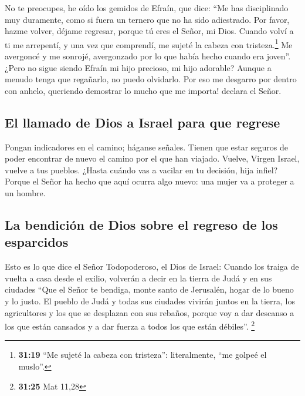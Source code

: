  No te preocupes, he oído los gemidos de Efraín, que
dice: ``Me has disciplinado muy duramente, como si fuera un ternero que
no ha sido adiestrado. Por favor, hazme volver, déjame regresar, porque
tú eres el Señor, mi Dios.  Cuando volví a ti me
arrepentí, y una vez que comprendí, me sujeté la cabeza con
tristeza.\footnote{\textbf{31:19} ``Me sujeté la cabeza con tristeza'':
  literalmente, ``me golpeé el muslo''.} Me avergoncé y me sonrojé,
avergonzado por lo que había hecho cuando era joven''. 
¿Pero no sigue siendo Efraín mi hijo precioso, mi hijo adorable? Aunque
a menudo tenga que regañarlo, no puedo olvidarlo. Por eso me desgarro
por dentro con anhelo, queriendo demostrar lo mucho que me importa!
declara el Señor.

\hypertarget{el-llamado-de-dios-a-israel-para-que-regrese}{%
\subsection{El llamado de Dios a Israel para que
regrese}\label{el-llamado-de-dios-a-israel-para-que-regrese}}

 Pongan indicadores en el camino; háganse señales. Tienen
que estar seguros de poder encontrar de nuevo el camino por el que han
viajado. Vuelve, Virgen Israel, vuelve a tus pueblos. 
¿Hasta cuándo vas a vacilar en tu decisión, hija infiel? Porque el Señor
ha hecho que aquí ocurra algo nuevo: una mujer va a proteger a un
hombre.

\hypertarget{la-bendiciuxf3n-de-dios-sobre-el-regreso-de-los-esparcidos}{%
\subsection{La bendición de Dios sobre el regreso de los
esparcidos}\label{la-bendiciuxf3n-de-dios-sobre-el-regreso-de-los-esparcidos}}

 Esto es lo que dice el Señor Todopoderoso, el Dios de
Israel: Cuando los traiga de vuelta a casa desde el exilio, volverán a
decir en la tierra de Judá y en sus ciudades ``Que el Señor te bendiga,
monte santo de Jerusalén, hogar de lo bueno y lo justo. 
El pueblo de Judá y todas sus ciudades vivirán juntos en la tierra, los
agricultores y los que se desplazan con sus rebaños, 
porque voy a dar descanso a los que están cansados y a dar fuerza a
todos los que están débiles''. \footnote{\textbf{31:25} Mat 11,28}

